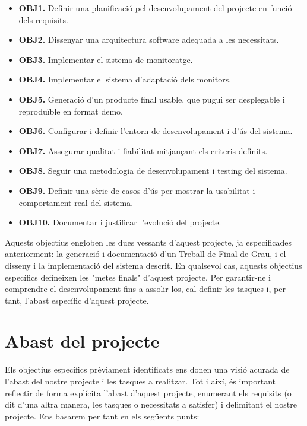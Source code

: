 \begin{itemize}
\item[] \textbf{OBJ1.} Definir una planificació pel desenvolupament del projecte en funció dels requisits.
\item[] \textbf{OBJ2.} Dissenyar una arquitectura software adequada a les necessitats.
\item[] \textbf{OBJ3.} Implementar el sistema de monitoratge.
\item[] \textbf{OBJ4.} Implementar el sistema d'adaptació dels monitors.
\item[] \textbf{OBJ5.} Generació d’un producte final usable, que pugui ser desplegable i reproduïble en format demo.
\item[] \textbf{OBJ6.} Configurar i definir l’entorn de desenvolupament i d’ús del sistema.
\item[] \textbf{OBJ7.} Assegurar qualitat i fiabilitat mitjançant els criteris definits.
\item[] \textbf{OBJ8.} Seguir una metodologia de desenvolupament i testing del sistema.
\item[] \textbf{OBJ9.} Definir una sèrie de casos d’ús per mostrar la usabilitat i comportament real del sistema.
\item[] \textbf{OBJ10.} Documentar i justificar l’evolució del projecte.
\end{itemize}

Aquests objectius engloben les dues vessants d'aquest projecte, ja especificades anteriorment: la generació i documentació d'un Treball de Final de Grau, i el disseny i la implementació del sistema descrit. En qualsevol cas, aquests objectius específics defineixen les "metes finals" d'aquest projecte. Per garantir-ne i comprendre el desenvolupament fins a assolir-los, cal definir les tasques i, per tant, l'abast específic d'aquest projecte.


\section{Abast del projecte}

Els objectius específics prèviament identificats ens donen una visió acurada de l’abast del nostre projecte i les tasques a realitzar. Tot i així, és important reflectir de forma explícita l’abast d’aquest projecte, enumerant els requisits (o dit d’una altra manera, les tasques o necessitats a satisfer) i delimitant el nostre projecte. Ens basarem per tant en els següents punts:


